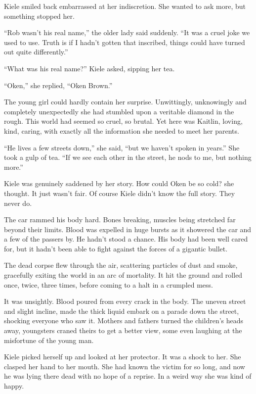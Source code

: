 Kiele smiled back embarrassed at her indiscretion.  She wanted to ask more, but something stopped her.

``Rob wasn't his real name,'' the older lady said suddenly.  ``It was a cruel joke we used to use.  Truth is if I hadn't gotten that inscribed, things could have turned out quite differently.''

``What was his real name?'' Kiele asked, sipping her tea.

``Oken,'' she replied, ``Oken Brown.''  

The young girl could hardly contain her surprise.  Unwittingly, unknowingly and completely unexpectedly she had stumbled upon a veritable diamond in the rough.  This world had seemed so cruel, so brutal.  Yet here was Kaitlin, loving, kind, caring, with exactly all the information she needed to meet her parents.

``He lives a few streets down,'' she said, ``but we haven't spoken in years.''  She took a gulp of tea.  ``If we see each other in the street, he nods to me, but nothing more.''

Kiele was genuinely saddened by her story.  How could Oken be so cold? she thought.  It just wasn't fair.  Of course Kiele didn't know the full story.  They never do.



\thoughtbreak



The car rammed his body hard.  Bones breaking, muscles being stretched far beyond their limits.  Blood was expelled in huge bursts as it showered the car and a few of the passers by.  He hadn't stood a chance.  His body had been well cared for, but it hadn't been able to fight against the forces of a gigantic bullet.  

The dead corpse flew through the air, scattering particles of dust and smoke, gracefully exiting the world in an arc of mortality.  It hit the ground and rolled once, twice, three times, before coming to a halt in a crumpled mess.  

It was unsightly.  Blood poured from every crack in the body.  The uneven street and slight incline, made the thick liquid embark on a parade down the street, shocking everyone who saw it.  Mothers and fathers turned the children's heads away, youngsters craned theirs to get a better view, some even laughing at the misfortune of the young man.

Kiele picked herself up and looked at her protector.  It was a shock to her.  She clasped her hand to her mouth.  She had known the victim for so long, and now he was lying there dead with no hope of a reprise.  In a weird way she was kind of happy.

